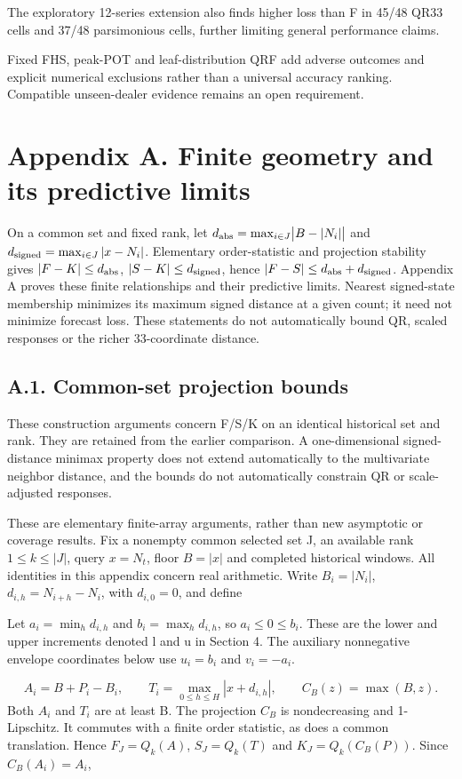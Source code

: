 \documentclass[10pt,a4paper]{article}
\begin{document}
The exploratory 12-series extension also finds higher loss than F in 45/48 QR33 cells and 37/48 parsimonious cells, further limiting general performance claims.

Fixed FHS, peak-POT and leaf-distribution QRF add adverse outcomes and explicit numerical exclusions rather than a universal accuracy ranking. Compatible unseen-dealer evidence remains an open requirement.

\section*{Appendix A. Finite geometry and its predictive limits}
On a common set and fixed rank, let \(d_{\rm abs}=\max_{i\in J}\bigl|B-|N_i|\bigr|\) and \(d_{\rm signed}=\max_{i\in J}|x-N_i|\). Elementary order-statistic and projection stability gives \(|F-K|\le d_{\rm abs}\), \(|S-K|\le d_{\rm signed}\), hence \(|F-S|\le d_{\rm abs}+d_{\rm signed}\). Appendix A proves these finite relationships and their predictive limits. Nearest signed-state membership minimizes its maximum signed distance at a given count; it need not minimize forecast loss. These statements do not automatically bound QR, scaled responses or the richer 33-coordinate distance.

\subsection*{A.1. Common-set projection bounds}
These construction arguments concern F/S/K on an identical historical set and rank. They are retained from the earlier comparison. A one-dimensional signed-distance minimax property does not extend automatically to the multivariate neighbor distance, and the bounds do not automatically constrain QR or scale-adjusted responses.

These are elementary finite-array arguments, rather than new asymptotic or coverage results. Fix a nonempty common selected set J, an available rank \(1\le k\le|J|\), query \(x=N_t\), floor \(B=|x|\) and completed historical windows. All identities in this appendix concern real arithmetic. Write \(B_i=|N_i|\), \(d_{i,h}=N_{i+h}-N_i\), with \(d_{i,0}=0\), and define

Let \(a_i=\min_h d_{i,h}\) and \(b_i=\max_h d_{i,h}\), so \(a_i\le0\le b_i\). These are the lower and upper increments denoted l and u in Section 4. The auxiliary nonnegative envelope coordinates below use \(u_i=b_i\) and \(v_i=-a_i\).

\[
A_i=B+P_i-B_i,\qquad T_i=\max_{0\le h\le H}|x+d_{i,h}|,\qquad C_B(z)=\max(B,z).
\]
Both \(A_i\) and \(T_i\) are at least B. The projection \(C_B\) is nondecreasing and 1-Lipschitz. It commutes with a finite order statistic, as does a common translation. Hence \(F_J=Q_k(A)\), \(S_J=Q_k(T)\) and \(K_J=Q_k(C_B(P))\). Since \(C_B(A_i)=A_i\),
\end{document}
